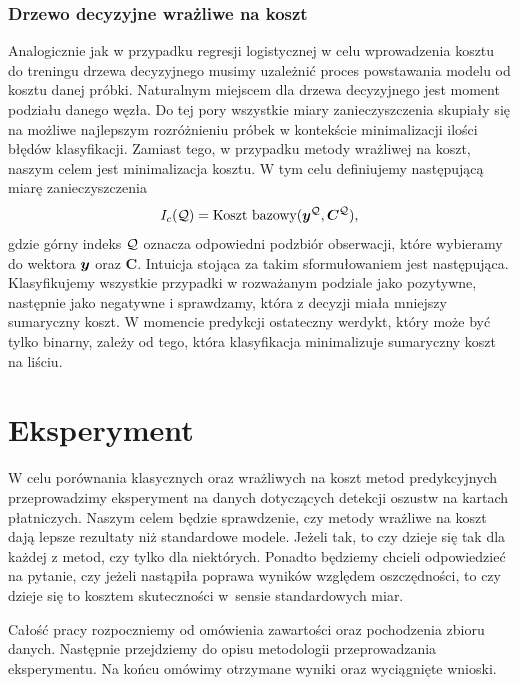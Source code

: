 \documentclass[inzynierska]{pwr_wmat_praca_dyplomowa}
\theoremstyle{plain}
\numberwithin{theorem}{chapter}
\theoremstyle{definition}
\numberwithin{theorem}{chapter}
\begin{document}
\subsection{Drzewo decyzyjne wrażliwe na koszt}
\label{csdt}
Analogicznie jak w przypadku regresji logistycznej w celu wprowadzenia kosztu do treningu drzewa decyzyjnego musimy uzależnić proces powstawania modelu od kosztu danej próbki. Naturalnym miejscem dla drzewa decyzyjnego jest moment podziału danego węzła. Do tej pory wszystkie miary zanieczyszczenia skupiały się na możliwe najlepszym rozróżnieniu próbek w kontekście minimalizacji ilości błędów klasyfikacji. Zamiast tego, w przypadku metody wrażliwej na koszt, naszym celem jest minimalizacja kosztu. W tym celu definiujemy następującą miarę zanieczyszczenia
$$ I_c(\mathcal{Q}) = \text{Koszt bazowy}(\boldsymbol{y}^{\mathcal{Q}}, \boldsymbol{C}^{\mathcal{Q}}) \text{,}$$
gdzie górny indeks $\mathcal{Q}$ oznacza odpowiedni podzbiór obserwacji, które wybieramy do wektora $\boldsymbol{y}$ oraz $\boldsymbol{C}$. Intuicja stojąca za takim sformułowaniem jest następująca. Klasyfikujemy wszystkie przypadki w rozważanym podziale jako pozytywne, następnie jako negatywne i sprawdzamy, która z decyzji miała mniejszy sumaryczny koszt. W momencie predykcji ostateczny werdykt, który może być tylko binarny, zależy od tego, która klasyfikacja minimalizuje sumaryczny koszt na liściu.

\chapter{Eksperyment}
W celu porównania klasycznych oraz wrażliwych na koszt metod predykcyjnych przeprowadzimy eksperyment na danych dotyczących detekcji oszustw na kartach płatniczych. Naszym celem będzie sprawdzenie, czy metody wrażliwe na koszt dają lepsze rezultaty niż standardowe modele. Jeżeli tak, to czy dzieje się tak dla każdej z metod, czy tylko dla niektórych. Ponadto będziemy chcieli odpowiedzieć na pytanie, czy jeżeli nastąpiła poprawa wyników względem oszczędności, to czy dzieje się to kosztem skuteczności w~sensie standardowych miar. 

Całość pracy rozpoczniemy od omówienia zawartości oraz pochodzenia zbioru danych. Następnie przejdziemy do opisu metodologii przeprowadzania eksperymentu. Na końcu omówimy otrzymane wyniki oraz wyciągnięte wnioski.
\end{document}
